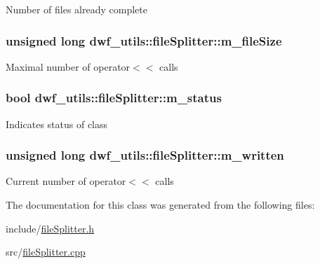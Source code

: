 \-Number of files already complete \hypertarget{classdwf__utils_1_1file_splitter_a61e584140f04b3a16f7c15a3df9e4cae}{
\subsubsection[{m\-\_\-file\-Size}]{\setlength{\rightskip}{0pt plus 5cm}unsigned long {\bf dwf\-\_\-utils\-::file\-Splitter\-::m\-\_\-file\-Size}}}\label{classdwf__utils_1_1file_splitter_a61e584140f04b3a16f7c15a3df9e4cae}
\-Maximal number of operator$<$$<$ calls \hypertarget{classdwf__utils_1_1file_splitter_a0222a87f2cd6079820e08313503e199e}{
\subsubsection[{m\-\_\-status}]{\setlength{\rightskip}{0pt plus 5cm}bool {\bf dwf\-\_\-utils\-::file\-Splitter\-::m\-\_\-status}}}\label{classdwf__utils_1_1file_splitter_a0222a87f2cd6079820e08313503e199e}
\-Indicates status of class \hypertarget{classdwf__utils_1_1file_splitter_a298fb3ee2f1a79399402cd325de1d2b7}{
\subsubsection[{m\-\_\-written}]{\setlength{\rightskip}{0pt plus 5cm}unsigned long {\bf dwf\-\_\-utils\-::file\-Splitter\-::m\-\_\-written}}}\label{classdwf__utils_1_1file_splitter_a298fb3ee2f1a79399402cd325de1d2b7}
\-Current number of operator$<$$<$ calls 

\-The documentation for this class was generated from the following files\-:\begin{DoxyCompactItemize}
\item 
include/\hyperlink{file_splitter_8h}{file\-Splitter.\-h}\item 
src/\hyperlink{file_splitter_8cpp}{file\-Splitter.\-cpp}\end{DoxyCompactItemize}
